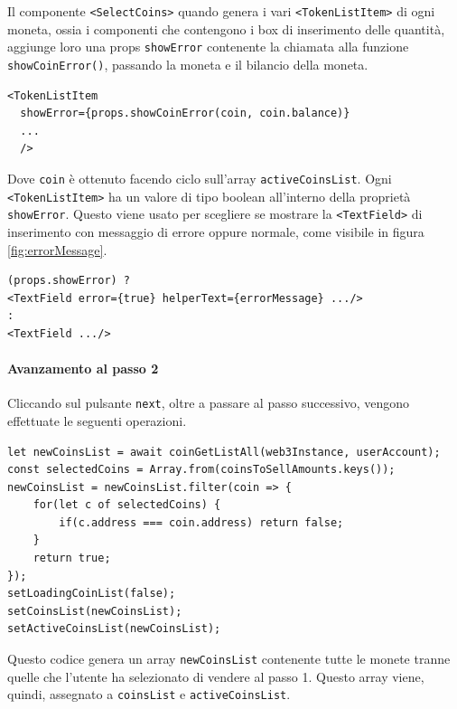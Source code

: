 \documentclass[a4paper]{article}
\begin{document}
        Il componente \verb|<SelectCoins>| quando genera i vari \verb|<TokenListItem>| di ogni moneta, ossia i componenti che contengono i box di inserimento delle quantità, aggiunge loro una props \verb|showError| contenente la chiamata alla funzione \verb|showCoinError()|,
        passando la moneta e il bilancio della moneta.
        \begin{lstlisting}[style=ES6, title={Funzione showCoinError}]
  <TokenListItem 
  showError={props.showCoinError(coin, coin.balance)}
  ... 
  />
\end{lstlisting}
        Dove \verb|coin| è ottenuto facendo ciclo sull'array \verb|activeCoinsList|.
        \newline
        Ogni \verb|<TokenListItem>| ha un valore di tipo boolean all'interno della proprietà \verb|showError|. Questo viene usato per scegliere se mostrare la \verb|<TextField>| di inserimento con messaggio di errore oppure normale, come visibile in figura \ref{fig:errorMessage}.
\begin{lstlisting}[style=ES6, title={Scelta di TextField da mostrare}]
(props.showError) ?
<TextField error={true} helperText={errorMessage} .../>
:
<TextField .../>\end{lstlisting}
        \paragraph{Avanzamento al passo 2}
        Cliccando sul pulsante \verb|next|, oltre a passare al passo successivo, vengono effettuate le seguenti operazioni.
\begin{lstlisting}[style=ES6, title={Codice eseguito passando al passo 2}]
let newCoinsList = await coinGetListAll(web3Instance, userAccount);
const selectedCoins = Array.from(coinsToSellAmounts.keys());
newCoinsList = newCoinsList.filter(coin => {
    for(let c of selectedCoins) {
        if(c.address === coin.address) return false;
    }
    return true;
});
setLoadingCoinList(false);
setCoinsList(newCoinsList);
setActiveCoinsList(newCoinsList);\end{lstlisting}
        Questo codice genera un array \verb|newCoinsList| contenente tutte le monete tranne quelle che l'utente ha selezionato di vendere al passo 1. Questo array viene, quindi, assegnato a \verb|coinsList| e \verb|activeCoinsList|.
\end{document}
